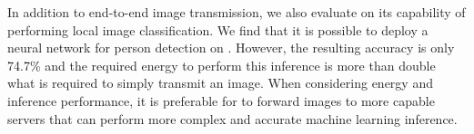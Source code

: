 In addition to end-to-end image transmission, we also evaluate \namec on its capability of performing local image classification. We find that it is possible to deploy a neural network for person detection on \namec. However, the resulting accuracy is only 74.7\% and the required energy to perform this inference is more than double what is required to simply transmit an image. 
When considering energy and inference performance, it is preferable for \namec to forward images to more capable servers that can perform more complex and accurate machine learning inference.

%

